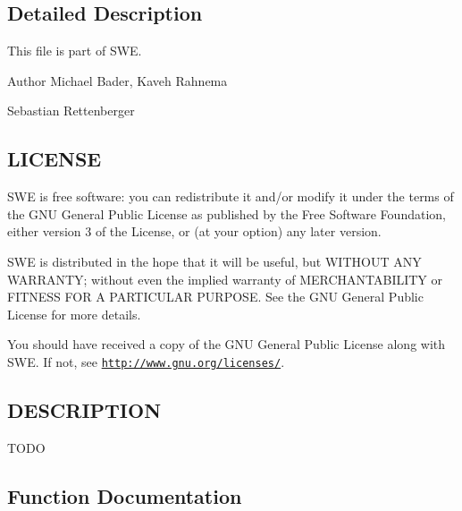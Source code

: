 \subsection{Detailed Description}
This file is part of S\+WE.

\begin{DoxyAuthor}{Author}
Michael Bader, Kaveh Rahnema 

Sebastian Rettenberger
\end{DoxyAuthor}
\hypertarget{help_8hh_LICENSE}{}\subsection{L\+I\+C\+E\+N\+SE}\label{help_8hh_LICENSE}
S\+WE is free software\+: you can redistribute it and/or modify it under the terms of the G\+NU General Public License as published by the Free Software Foundation, either version 3 of the License, or (at your option) any later version.

S\+WE is distributed in the hope that it will be useful, but W\+I\+T\+H\+O\+UT A\+NY W\+A\+R\+R\+A\+N\+TY; without even the implied warranty of M\+E\+R\+C\+H\+A\+N\+T\+A\+B\+I\+L\+I\+TY or F\+I\+T\+N\+E\+SS F\+OR A P\+A\+R\+T\+I\+C\+U\+L\+AR P\+U\+R\+P\+O\+SE. See the G\+NU General Public License for more details.

You should have received a copy of the G\+NU General Public License along with S\+WE. If not, see \href{http://www.gnu.org/licenses/}{\tt http\+://www.\+gnu.\+org/licenses/}.\hypertarget{help_8hh_DESCRIPTION}{}\subsection{D\+E\+S\+C\+R\+I\+P\+T\+I\+ON}\label{help_8hh_DESCRIPTION}
T\+O\+DO 

\subsection{Function Documentation}
